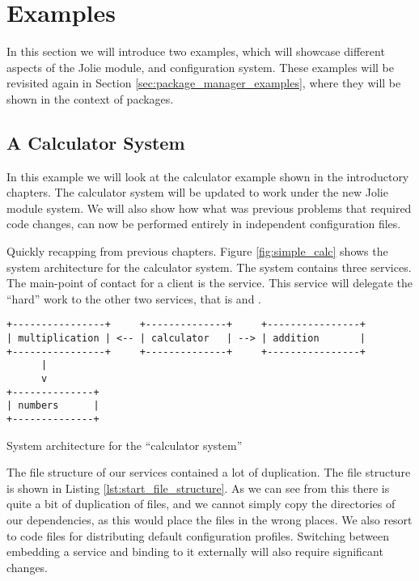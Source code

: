 \section{Examples}
\label{sec:module_examples}

In this section we will introduce two examples, which will showcase different
aspects of the Jolie module, and configuration system. These examples will be
revisited again in Section \ref{sec:package_manager_examples}, where they will
be shown in the context of packages.

\subsection{A Calculator System}

In this example we will look at the calculator example shown in the
introductory chapters. The calculator system will be updated to work under the
new Jolie module system. We will also show how what was previous problems that
required code changes, can now be performed entirely in independent
configuration files.

Quickly recapping from previous chapters.  Figure \ref{fig:simple_calc} shows
the system architecture for the calculator system. The system contains three
services. The main-point of contact for a client is the 
service. This service will delegate the ``hard'' work to the other two
services, that is  and .

\begin{listing}[H]
\begin{verbatim}
+----------------+     +--------------+     +----------------+
| multiplication | <-- | calculator   | --> | addition       |
+----------------+     +--------------+     +----------------+
      |
      v
+--------------+
| numbers      |
+--------------+
\end{verbatim}
\caption{System architecture for the ``calculator system''}
\label{fig:simple_calc}
\end{listing}

The file structure of our services contained a lot of duplication. The file
structure is shown in Listing \ref{lst:start_file_structure}. As we can see
from this there is quite a bit of duplication of files, and we cannot simply
copy the directories of our dependencies, as this would place the files in the
wrong places. We also resort to code files for distributing default
configuration profiles. Switching between embedding a service and binding to it
externally will also require significant changes.

